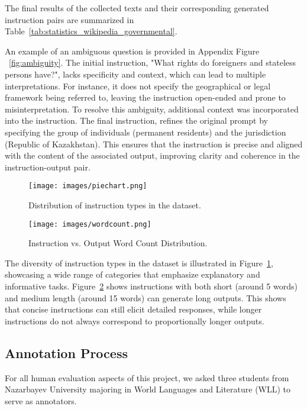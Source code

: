 \par
The final results of the collected texts and their corresponding generated instruction pairs are summarized in Table~\ref{tab:statistics_wikipedia_governmental}.
\par

An example of an ambiguous question is provided in Appendix Figure ~\ref{fig:ambiguity}. The initial instruction, "What rights do foreigners and stateless persons have?", lacks specificity and context, which can lead to multiple interpretations. For instance,  it does not specify the geographical or legal framework being referred to, leaving the instruction open-ended and prone to misinterpretation. To resolve this ambiguity, additional context was incorporated into the instruction. The final instruction, refines the original prompt by specifying the group of individuals (permanent residents) and the jurisdiction (Republic of Kazakhstan). This ensures that the instruction is precise and aligned with the content of the associated output, improving clarity and coherence in the instruction-output pair.


\begin{figure}[h]
\centering
\texttt{[image: images/piechart.png]} %
\caption{Distribution of instruction types in the dataset.}
\label{fig:piechart}
\end{figure}

\begin{figure}[h]
\centering
\texttt{[image: images/wordcount.png]} %
\caption{ Instruction vs. Output Word Count Distribution.}
\label{fig:instruction_distribution}
\end{figure}





\par
The diversity of instruction types in the dataset is illustrated in Figure~\ref{fig:piechart}, showcasing a wide range of categories that emphasize explanatory and informative tasks.  Figure~\ref{fig:instruction_distribution} shows instructions with both short (around 5 words) and medium length (around 15 words) can generate long outputs. This shows that concise instructions can still elicit detailed responses, while longer instructions do not always correspond to proportionally longer outputs.


\subsection{Annotation Process}
For all human evaluation aspects of this project, we asked three students from Nazarbayev University majoring in World Languages and Literature (WLL) to serve as annotators.
